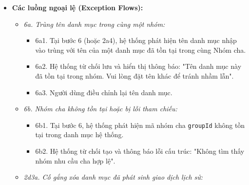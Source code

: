 \documentclass[11pt,a4paper]{article}
\providecommand{\tightlist}{
  \setlength{\itemsep}{0pt}\setlength{\parskip}{0pt}}
\begin{document}
\begin{itemize}
\begin{itemize}
    \begin{itemize}
    \tightlist
    \item
      2d1. Người dùng chọn một danh mục và nhấn nút "Xóa danh mục".
    \item
      2d2. Hệ thống quét bảng nhật ký \texttt{transactions} để kiểm tra
      sự tồn tại của các giao dịch tham chiếu tới \texttt{categoryId}
      này.
    \item
      2d3. Nếu hoàn toàn CHƯA CÓ giao dịch nào liên kết, hệ thống hiển
      thị hộp thoại xác nhận xóa vĩnh viễn.
    \item
      2d4. Người dùng xác nhận xóa.
    \item
      2d5. Hệ thống thực hiện xóa vật lý bản ghi danh mục khỏi cơ sở dữ
      liệu và thông báo xóa thành công.
    \end{itemize}
  \end{itemize}
\item
  \textbf{Các luồng ngoại lệ (Exception Flows):}

  \begin{itemize}
  \tightlist
  \item
    \emph{6a. Trùng tên danh mục trong cùng một nhóm:}

    \begin{itemize}
    \tightlist
    \item
      6a1. Tại bước 6 (hoặc 2a4), hệ thống phát hiện tên danh mục nhập
      vào trùng với tên của một danh mục đã tồn tại trong cùng Nhóm cha.
    \item
      6a2. Hệ thống từ chối lưu và hiển thị thông báo: "Tên danh mục này
      đã tồn tại trong nhóm. Vui lòng đặt tên khác để tránh nhầm lẫn".
    \item
      6a3. Người dùng điều chỉnh lại tên danh mục.
    \end{itemize}
  \item
    \emph{6b. Nhóm cha không tồn tại hoặc bị lỗi tham chiếu:}

    \begin{itemize}
    \tightlist
    \item
      6b1. Tại bước 6, hệ thống phát hiện mã nhóm cha \texttt{groupId}
      không tồn tại trong danh mục hệ thống.
    \item
      6b2. Hệ thống từ chối tạo và thông báo lỗi cấu trúc: "Không tìm
      thấy nhóm nhu cầu cha hợp lệ".
    \end{itemize}
  \item
    \emph{2d3a. Cố gắng xóa danh mục đã phát sinh giao dịch lịch sử:}


\end{itemize}
\end{itemize}
\end{document}
